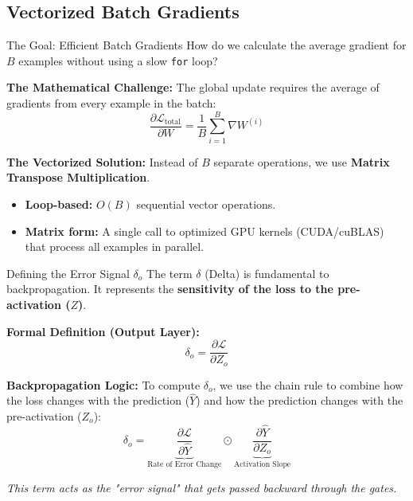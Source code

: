 \documentclass[5pt,aspectratio=169]{beamer}
\begin{document}
\subsection{Vectorized Batch Gradients}
\begin{frame}{The Goal: Efficient Batch Gradients}
How do we calculate the average gradient for $B$ examples without using a slow \texttt{for} loop?

\textbf{The Mathematical Challenge:}
The global update requires the average of gradients from every example in the batch:
\[ \frac{\partial \mathcal{L}_{\text{total}}}{\partial W} = \frac{1}{B} \sum_{i=1}^{B} \nabla W^{(i)} \]

\textbf{The Vectorized Solution:}
Instead of $B$ separate operations, we use \textbf{Matrix Transpose Multiplication}.
\begin{itemize}
    \item \textbf{Loop-based:} $O(B)$ sequential vector operations.
    \item \textbf{Matrix form:} A single call to optimized GPU kernels (CUDA/cuBLAS) that process all examples in parallel.
\end{itemize}
\end{frame}

\begin{frame}{Defining the Error Signal $\delta_o$}
The term \textbf{$\delta$} (Delta) is fundamental to backpropagation. It represents the \textbf{sensitivity of the loss to the pre-activation ($Z$)}.

\textbf{Formal Definition (Output Layer):}
\[ \delta_o = \frac{\partial \mathcal{L}}{\partial Z_o} \]

\textbf{Backpropagation Logic:}
To compute $\delta_o$, we use the chain rule to combine how the loss changes with the prediction ($\hat{Y}$) and how the prediction changes with the pre-activation ($Z_o$):
\[ 
\delta_o = \underbrace{\frac{\partial \mathcal{L}}{\partial \hat{Y}}}_{\text{Rate of Error Change}} \odot \underbrace{\frac{\partial \hat{Y}}{\partial Z_o}}_{\text{Activation Slope}} 
\]

\vfill
\centering
\textit{This term acts as the "error signal" that gets passed backward through the gates.}
\end{frame}
\end{document}
